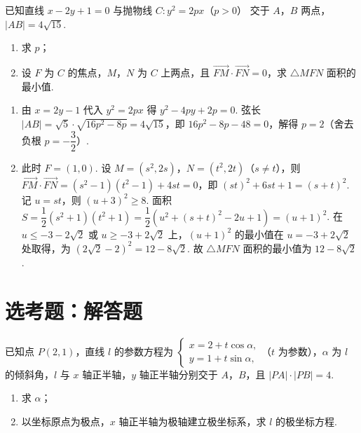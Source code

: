 \begin{problem}
已知直线 \(x-2y+1=0\) 与抛物线 \(C:y^2=2px\)（\(p>0\)） 交于 \(A\)，\(B\) 两点，\(|AB|=4\sqrt{15}\).
\begin{enumerate}
\item 求 \(p\)；
\item 设 \(F\) 为 \(C\) 的焦点，\(M\)，\(N\) 为 \(C\) 上两点，且 \(\overrightarrow{FM}\cdot\overrightarrow{FN}=0\)，求 \(\triangle MFN\) 面积的最小值.
\end{enumerate}
\end{problem}

\begin{solution}
\begin{enumerate}
\item 由 \(x=2y-1\) 代入 \(y^2=2px\) 得 \(y^2-4py+2p=0\). 弦长 \(|AB|=\sqrt5\cdot\sqrt{16p^2-8p}=4\sqrt{15}\)，即 \(16p^2-8p-48=0\)，解得 \(p=2\)（舍去负根 \(p=-\dfrac32\)）.
\item 此时 \(F=(1,0)\). 设 \(M=(s^2,2s)\)，\(N=(t^2,2t)\)（\(s\ne t\)），则 \(\overrightarrow{FM}\cdot\overrightarrow{FN}=(s^2-1)(t^2-1)+4st=0\)，即 \((st)^2+6st+1=(s+t)^2\). 记 \(u=st\)，则 \((u+3)^2\geqslant8\). 面积 \(S=\dfrac12(s^2+1)(t^2+1)=\dfrac12\left(u^2+(s+t)^2-2u+1\right)=(u+1)^2\). 在 \(u\leqslant-3-2\sqrt2\) 或 \(u\geqslant-3+2\sqrt2\) 上，\((u+1)^2\) 的最小值在 \(u=-3+2\sqrt2\) 处取得，为 \((2\sqrt2-2)^2=12-8\sqrt2\). 故 \(\triangle MFN\) 面积的最小值为 \(12-8\sqrt{2}\).
\end{enumerate}
\end{solution}

\section{选考题：解答题}

\begin{problem}
已知点 \(P(2,1)\)，直线 \(l\) 的参数方程为
\(\begin{cases}
x=2+t\cos\alpha,\\
y=1+t\sin\alpha,
\end{cases}\)（\(t\) 为参数），\(\alpha\) 为 \(l\) 的倾斜角，\(l\) 与 \(x\) 轴正半轴，\(y\) 轴正半轴分别交于 \(A\)，\(B\)，且 \(|PA|\cdot|PB|=4\).
\begin{enumerate}
\item 求 \(\alpha\)；
\item 以坐标原点为极点，\(x\) 轴正半轴为极轴建立极坐标系，求 \(l\) 的极坐标方程.
\end{enumerate}
\end{problem}

